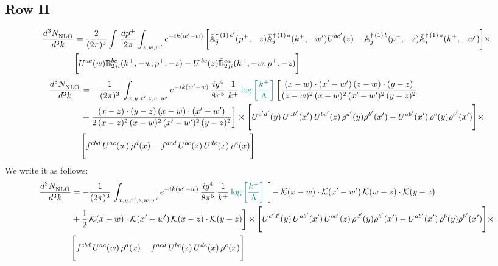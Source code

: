 \documentclass[9pt]{article}
\def\mf#1{\mathbb{#1}}
\numberwithin{equation}{section}
\begin{document}
\subsection{Row II}
\begin{align}
    \frac{d^{3}N_{\rm NLO}^{\rm}}{d^{3}k}  & =    \frac{2}{(2\pi)^{3}} \int\, \frac{dp^{+}}{2\pi}\int_{z,w,w^{\prime}} e^{-ik(w^{\prime}-w)}\,\bigg[\Bar{\mf{A}}^{\dagger\,(1)\, c^{\prime}}_{j}(p^{+},-z)\Bar{\mf{A}}^{\dagger\, (1)\, a}_{i}(k^{+},- w^{\prime})U^{bc^{\prime}}(z) - \mf{A}^{\dagger\, (1)\, b}_{j}(p^{+},- z)\Bar{\mf{A}}^{\dagger\, (1)\, a}_{i}(k^{+},- w^{\prime})\bigg] \times \notag \\ & \bigg[U^{ac}(w) \mf{B}^{bc}_{2ji}(k^{+},-w;p^{+},-z) -U^{\, bc}(z)\Bar{\mf{B}}^{ca}_{2ji}(k^{+},-w; p^{+},-z)\bigg] \nonumber
\end{align}
\begin{align}
 \frac{d^{3}N_{\rm NLO}^{\rm}}{d^{3}k}  & =    -\frac{1}{(2\pi)^{3}}\, \int_{x,y,x',z,w,w^{\prime}} e^{-ik(w^{\prime}-w)}\,\frac{ig^{4}}{8\pi^{5}}\,\frac{1}{k^{+}}\,{\color{teal}\log{\left[\frac{k^{+}}{\Lambda}\right]}}\,\bigg[\frac{(x-w)\cdot (x'-w')\,(z-w)\cdot (y-z)}{(z-w)^{2}\,(x-w)^{2}\,(x'-w')^{2}\,(y-z)^{2}}\notag \\ & +\frac{(x-z)\cdot (y-z)\,(x-w)\cdot (x'-w')}{2\,(x-z)^{2}\, (x-w)^{2}\,(x'-w')^{2}\,(y-z)^{2}}\bigg]\times\Bigg[U^{c'd'}(y)\,U^{ab'}(x')\,U^{bc'}(z)\,\rho^{d'}(y)\rho^{b'}(x')-U^{ab'}(x')\,\rho^{b}(y)\rho^{b'}(x')\Bigg]\times\notag \\ & \Bigg[f^{cbd}\,U^{ac}(w)\,\rho^{d}(x)-f^{acd}\, U^{bc}(z)\,U^{de}(x)\,\rho^{e}(x)\Bigg]
\end{align}
We write it as follows:
\begin{align}
 \frac{d^{3}N_{\rm NLO}^{\rm}}{d^{3}k}  & =    -\frac{1}{(2\pi)^{3}}\, \int_{x,y,x',z,w,w^{\prime}} e^{-ik(w^{\prime}-w)}\,\frac{ig^{4}}{8\pi^{5}}\,\frac{1}{k^{+}}\,{\color{teal}\log{\left[\frac{k^{+}}{\Lambda}\right]}}\,\bigg[-\mathcal{K}(x-w)\cdot \mathcal{K}(x'-w')\, \mathcal{K}(w-z)\cdot \mathcal{K}(y-z)\notag \\ & +\frac{1}{2}\,\mathcal{K}(x-w)\cdot \mathcal{K}(x'-w')\, \mathcal{K}(x-z)\cdot \mathcal{K}(y-z)\bigg]\times\Bigg[U^{c'd'}(y)\,U^{ab'}(x')\,U^{bc'}(z)\,\rho^{d'}(y)\rho^{b'}(x')-U^{ab'}(x')\,\rho^{b}(y)\rho^{b'}(x')\Bigg]\times\notag \\ & \Bigg[f^{cbd}\,U^{ac}(w)\,\rho^{d}(x)-f^{acd}\, U^{bc}(z)\,U^{de}(x)\,\rho^{e}(x)\Bigg]
\end{align}
\end{document}

